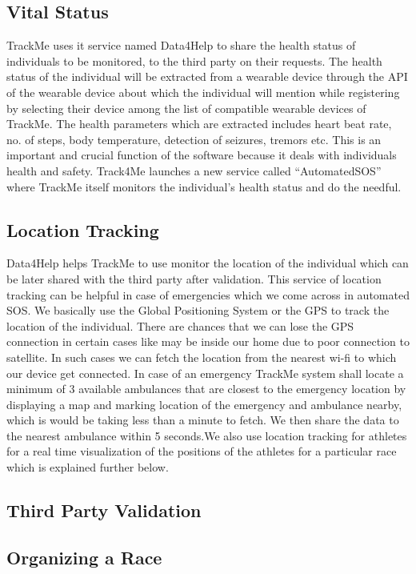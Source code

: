 \subsection{Vital Status}
\qquad TrackMe uses it service named Data4Help to share the health status of individuals to be monitored, to the third party on their requests. The health status of the individual will be extracted from a wearable device through the API of the wearable device about which the individual will mention while registering by selecting their device among the list of compatible wearable devices of TrackMe. The health parameters which are extracted includes heart beat rate, no. of steps, body temperature, detection of seizures, tremors etc. This is an important and crucial function of the software because it deals with individuals health and safety. Track4Me launches a new service called “AutomatedSOS” where TrackMe itself monitors the individual's health status and do the needful.

\subsection{Location Tracking}
\qquad Data4Help helps TrackMe to use monitor the location of the individual which can be later shared with the third party after validation. This service of location tracking can be helpful in case of emergencies which we come across in automated SOS. We basically use the Global Positioning System or the GPS to track the location of the individual. There are chances that we can lose the GPS connection in certain cases like may be inside our home due to poor connection to satellite. In such cases we can fetch the location from the nearest wi-fi to which our device get connected. In case of an emergency TrackMe system shall locate a minimum of 3 available ambulances that are closest to the emergency location by displaying a map and marking location of the emergency and ambulance nearby, which is would be taking less than a minute to fetch. We then share the data to the nearest ambulance within 5 seconds.We also use location tracking for athletes for a real time visualization of the positions of the athletes for a particular race which is explained further below.

\subsection{Third Party Validation}

\subsection{Organizing a Race}


